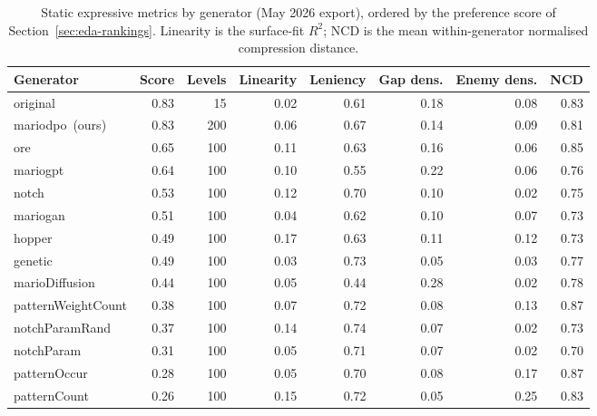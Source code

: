 \documentclass[shortabstract, mgr, english]{iithesis}
\begin{document}
\begin{table}[H]
\centering
\footnotesize
\setlength{\tabcolsep}{3.5pt}
\begin{tabular}{@{} l r r r r r r r @{}}
\toprule
\textbf{Generator} & \textbf{Score} & \textbf{Levels} & \textbf{Linearity} & \textbf{Leniency} & \textbf{Gap dens.} & \textbf{Enemy dens.} & \textbf{NCD} \\
\midrule
original           & 0.83 & 15  & 0.02 & 0.61 & 0.18 & 0.08 & 0.83 \\
mariodpo~(ours)           & 0.83 & 200 & 0.06 & 0.67 & 0.14 & 0.09 & 0.81 \\
ore                & 0.65 & 100 & 0.11 & 0.63 & 0.16 & 0.06 & 0.85 \\
mariogpt           & 0.64 & 100 & 0.10 & 0.55 & 0.22 & 0.06 & 0.76 \\
notch              & 0.53 & 100 & 0.12 & 0.70 & 0.10 & 0.02 & 0.75 \\
mariogan           & 0.51 & 100 & 0.04 & 0.62 & 0.10 & 0.07 & 0.73 \\
hopper             & 0.49 & 100 & 0.17 & 0.63 & 0.11 & 0.12 & 0.73 \\
genetic            & 0.49 & 100 & 0.03 & 0.73 & 0.05 & 0.03 & 0.77 \\
marioDiffusion     & 0.44 & 100 & 0.05 & 0.44 & 0.28 & 0.02 & 0.78 \\
patternWeightCount & 0.38 & 100 & 0.07 & 0.72 & 0.08 & 0.13 & 0.87 \\
notchParamRand     & 0.37 & 100 & 0.14 & 0.74 & 0.07 & 0.02 & 0.73 \\
notchParam         & 0.31 & 100 & 0.05 & 0.71 & 0.07 & 0.02 & 0.70 \\
patternOccur       & 0.28 & 100 & 0.05 & 0.70 & 0.08 & 0.17 & 0.87 \\
patternCount       & 0.26 & 100 & 0.15 & 0.72 & 0.05 & 0.25 & 0.83 \\
\bottomrule
\end{tabular}
\caption{Static expressive metrics by generator (May 2026 export),
ordered by the preference score of Section~\ref{sec:eda-rankings}. Linearity
is the surface-fit $R^2$; NCD is the mean within-generator normalised
compression distance.}
\label{tab:eda-static-metrics}
\end{table}
\end{document}
